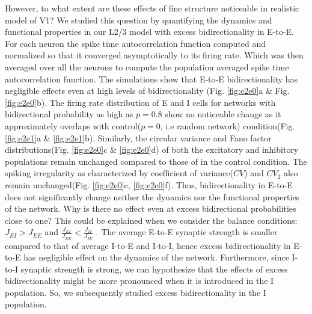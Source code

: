 However, to what extent are these effects of fine structure noticeable in realistic model of V1?  We studied this question by quantifying the dynamics and functional properties in our L2/3 model with excess bidirectionality in E-to-E. For each neuron the spike time autocorrelation function computed and normalized so that it converged asymptotically to its firing rate. Which was then averaged over all the neurons  to compute the population averaged spike time autocorrelation function. The simulations show that E-to-E bidirectionality has negligible effects even at high levels of bidirectionality (Fig. \ref{fig:e2e0}a \& Fig. \ref{fig:e2e0}b). The firing rate distribution of E and I cells for networks with bidirectional probability as high as $p = 0.8$ show no noticeable change as it approximately overlaps with control($p = 0$, i.e random network) condition(Fig. \ref{fig:e2e1}a \& \ref{fig:e2e1}b). Similarly, the circular variance and Fano factor distributions(Fig. \ref{fig:e2e0}c \& \ref{fig:e2e0}d) of both the excitatory and inhibitory populations remain unchanged compared to those of in the control condition. The spiking irregularity as characterized by coefficient of variance($CV$) and $CV_2$ also remain unchanged(Fig. \ref{fig:e2e0}e, \ref{fig:e2e0}f). Thus, bidirectionality in E-to-E does not significantly change neither the dynamics nor the functional properties of the network. Why is there no effect even at excess bidirectional probabilities close to one?  This could be explained when we consider the balance conditions: $J_{EI} > J_{EE}$ and $\frac{J_{EI}}{J_{EE}} < \frac{J_{II}}{J_{IE}}$ \cite{carl1998}. The average E-to-E synaptic strength is smaller compared to that of average I-to-E and I-to-I, hence excess bidirectionality in E-to-E has negligible effect on the dynamics of the network. Furthermore, since I-to-I synaptic strength is strong, we can hypothesize that the effects of excess bidirectionality might be more pronounced when it is introduced in the I population. So, we subsequently studied excess bidirectionality in the I population. \\

